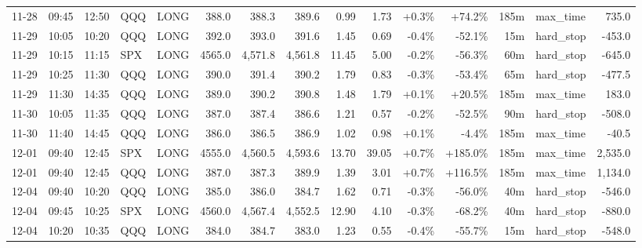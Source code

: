 \documentclass[11pt,a4paper,twoside]{article}
\begin{document}
\begin{landscape}
\begin{center}
\begin{longtable}{>{\color{txtmain}}l l l l l r r r r r r r r >{\color{txtmain}}l r}
11-28 & 09:45 & 12:50 & QQQ & LONG & 388.0 & 388.3 & 389.6 & 0.99 & 1.73 & \textcolor{wingreen}{+0.3\%} & \textcolor{wingreen}{+74.2\%} & 185m & max\_time & \textcolor{wingreen}{735.0} \\
11-29 & 10:05 & 10:20 & QQQ & LONG & 392.0 & 393.0 & 391.6 & 1.45 & 0.69 & \textcolor{lossred}{-0.4\%} & \textcolor{lossred}{-52.1\%} & 15m & hard\_stop & \textcolor{lossred}{-453.0} \\
11-29 & 10:15 & 11:15 & SPX & LONG & 4565.0 & 4,571.8 & 4,561.8 & 11.45 & 5.00 & \textcolor{lossred}{-0.2\%} & \textcolor{lossred}{-56.3\%} & 60m & hard\_stop & \textcolor{lossred}{-645.0} \\
11-29 & 10:25 & 11:30 & QQQ & LONG & 390.0 & 391.4 & 390.2 & 1.79 & 0.83 & \textcolor{lossred}{-0.3\%} & \textcolor{lossred}{-53.4\%} & 65m & hard\_stop & \textcolor{lossred}{-477.5} \\
11-29 & 11:30 & 14:35 & QQQ & LONG & 389.0 & 390.2 & 390.8 & 1.48 & 1.79 & \textcolor{wingreen}{+0.1\%} & \textcolor{wingreen}{+20.5\%} & 185m & max\_time & \textcolor{wingreen}{183.0} \\
11-30 & 10:05 & 11:35 & QQQ & LONG & 387.0 & 387.4 & 386.6 & 1.21 & 0.57 & \textcolor{lossred}{-0.2\%} & \textcolor{lossred}{-52.5\%} & 90m & hard\_stop & \textcolor{lossred}{-508.0} \\
11-30 & 11:40 & 14:45 & QQQ & LONG & 386.0 & 386.5 & 386.9 & 1.02 & 0.98 & \textcolor{wingreen}{+0.1\%} & \textcolor{lossred}{-4.4\%} & 185m & max\_time & \textcolor{lossred}{-40.5} \\
12-01 & 09:40 & 12:45 & SPX & LONG & 4555.0 & 4,560.5 & 4,593.6 & 13.70 & 39.05 & \textcolor{wingreen}{+0.7\%} & \textcolor{wingreen}{+185.0\%} & 185m & max\_time & \textcolor{wingreen}{2,535.0} \\
12-01 & 09:40 & 12:45 & QQQ & LONG & 387.0 & 387.3 & 389.9 & 1.39 & 3.01 & \textcolor{wingreen}{+0.7\%} & \textcolor{wingreen}{+116.5\%} & 185m & max\_time & \textcolor{wingreen}{1,134.0} \\
12-04 & 09:40 & 10:20 & QQQ & LONG & 385.0 & 386.0 & 384.7 & 1.62 & 0.71 & \textcolor{lossred}{-0.3\%} & \textcolor{lossred}{-56.0\%} & 40m & hard\_stop & \textcolor{lossred}{-546.0} \\
12-04 & 09:45 & 10:25 & SPX & LONG & 4560.0 & 4,567.4 & 4,552.5 & 12.90 & 4.10 & \textcolor{lossred}{-0.3\%} & \textcolor{lossred}{-68.2\%} & 40m & hard\_stop & \textcolor{lossred}{-880.0} \\
12-04 & 10:20 & 10:35 & QQQ & LONG & 384.0 & 384.7 & 383.0 & 1.23 & 0.55 & \textcolor{lossred}{-0.4\%} & \textcolor{lossred}{-55.7\%} & 15m & hard\_stop & \textcolor{lossred}{-548.0} \\

\end{longtable}
\end{center}
\end{landscape}
\end{document}
